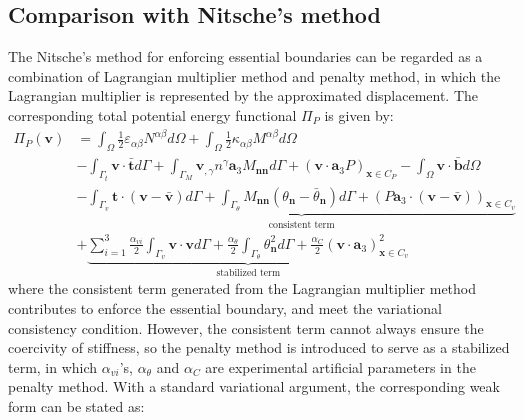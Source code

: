 \subsection{Comparison with Nitsche's method}
The Nitsche's method for enforcing essential boundaries can be regarded as a combination of Lagrangian multiplier method and penalty method, in which the Lagrangian multiplier is represented by the approximated displacement. The corresponding total potential energy functional $\Pi_P$ is given by:
\begin{equation}
\begin{split}
\Pi_P(\boldsymbol v) &= \int_\Omega \frac{1}{2}\varepsilon_{\alpha\beta} N^{\alpha\beta} d\Omega +
\int_\Omega \frac{1}{2} \kappa_{\alpha\beta}M^{\alpha\beta} d\Omega \\
                     &- \int_{\Gamma_t} \boldsymbol v \cdot \bar{\boldsymbol t} d\Gamma 
                     + \int_{\Gamma_M} \boldsymbol v_{,\gamma} n^\gamma \boldsymbol a_3 M_{\boldsymbol{nn}} d\Gamma
                     + (\boldsymbol v \cdot \boldsymbol a_3 P)_{\boldsymbol x \in C_P}
                     - \int_\Omega \boldsymbol v \cdot \bar{\boldsymbol b} d\Omega \\
                     &- \underbrace{\int_{\Gamma_v} \boldsymbol t \cdot (\boldsymbol v - \bar{\boldsymbol v}) d\Gamma
                     + \int_{\Gamma_\theta} M_{\boldsymbol{nn}}(\theta_{\boldsymbol n} - \bar \theta_{\boldsymbol n})d\Gamma
                     + (P\boldsymbol a_3 \cdot (\boldsymbol v - \bar{\boldsymbol v}))_{\boldsymbol x \in C_v}}_{\text{consistent term}} \\
                     &+ \underbrace{\sum_{i=1}^3\frac{\alpha_{vi}}{2} \int_{\Gamma_v} \boldsymbol v \cdot \boldsymbol v d\Gamma 
                     + \frac{\alpha_\theta}{2} \int_{\Gamma_\theta} \theta_{\boldsymbol n}^2 d\Gamma
             + \frac{\alpha_C}{2}(\boldsymbol v \cdot \boldsymbol a_3)^2_{\boldsymbol x\in C_v}}_{\text{stabilized term}}
\end{split}
\end{equation}
where the consistent term generated from the Lagrangian multiplier method contributes to enforce the essential boundary, and meet the variational consistency condition. However, the consistent term cannot always ensure the coercivity of stiffness, so the penalty method is introduced to serve as a stabilized term, in which $\alpha_{vi}$'s, $\alpha_\theta$ and $\alpha_C$ are experimental artificial parameters in the penalty method. With a standard variational argument, the corresponding weak form can be stated as:
